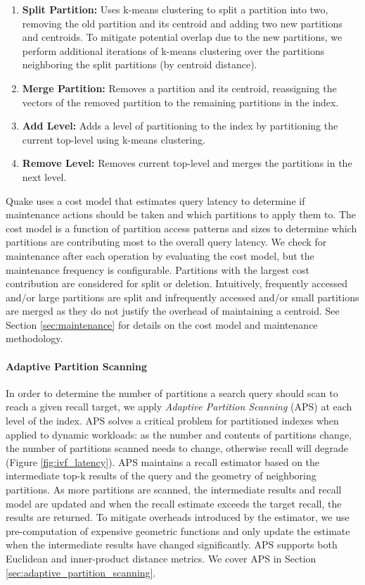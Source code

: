 \begin{enumerate}[leftmargin=*, itemsep=0em, topsep=0pt]
\item \textbf{Split Partition:} Uses k-means clustering to split a partition into two, removing the old partition and its centroid and adding two new partitions and centroids. To mitigate potential overlap due to the new partitions, we perform additional iterations of k-means clustering over the partitions neighboring the split partitions (by centroid distance).
\item \textbf{Merge Partition:} Removes a partition and its centroid, reassigning the vectors of the removed partition to the remaining partitions in the index.
\item \textbf{Add Level:} Adds a level of partitioning to the index by partitioning the current top-level using k-means clustering.
\item \textbf{Remove Level:} Removes current top-level and merges the partitions in the next level.
\end{enumerate}

Quake uses a cost model that estimates query latency to determine if maintenance actions should be taken and which partitions to apply them to. The cost model is a function of partition access patterns and sizes to determine which partitions are contributing most to the overall query latency. We check for maintenance after each operation by evaluating the cost model, but the maintenance frequency is configurable. Partitions with the largest cost contribution are considered for split or deletion. Intuitively, frequently accessed and/or large partitions are split and infrequently accessed and/or small partitions are merged as they do not justify the overhead of maintaining a centroid. See Section \ref{sec:maintenance} for details on the cost model and maintenance methodology.

\paragraph{Adaptive Partition Scanning} In order to determine the number of partitions a search query should scan to reach a given recall target, we apply \emph{Adaptive Partition Scanning} (APS) at each level of the index. APS solves a critical problem for partitioned indexes when applied to dynamic workloads: as the number and contents of partitions change, the number of partitions scanned needs to change, otherwise recall will degrade (Figure \ref{fig:ivf_latency}). APS maintains a recall estimator based on the intermediate top-k results of the query and the geometry of neighboring partitions. As more partitions are scanned, the intermediate results and recall model are updated and when the recall estimate exceeds the target recall, the results are returned. To mitigate overheads introduced by the estimator, we use pre-computation of expensive geometric functions and only update the estimate when the intermediate results have changed significantly. APS supports both Euclidean and inner-product distance metrics. We cover APS in Section \ref{sec:adaptive_partition_scanning}.

